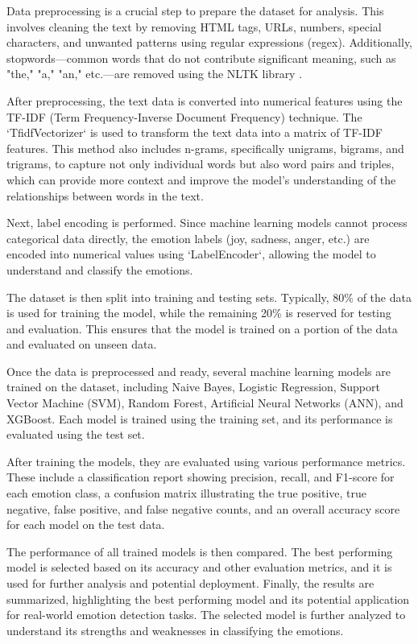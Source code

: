 Data preprocessing is a crucial step to prepare the dataset for analysis. This involves cleaning the text by removing HTML tags, URLs, numbers, special characters, and unwanted patterns using regular expressions (regex). Additionally, stopwords—common words that do not contribute significant meaning, such as "the," "a," "an," etc.—are removed using the NLTK library \cite{opinosis2024stopwords}.

After preprocessing, the text data is converted into numerical features using the TF-IDF (Term Frequency-Inverse Document Frequency) technique. The `TfidfVectorizer` is used to transform the text data into a matrix of TF-IDF features. This method also includes n-grams, specifically unigrams, bigrams, and trigrams, to capture not only individual words but also word pairs and triples, which can provide more context and improve the model's understanding of the relationships between words in the text.

Next, label encoding is performed. Since machine learning models cannot process categorical data directly, the emotion labels (joy, sadness, anger, etc.) are encoded into numerical values using `LabelEncoder`, allowing the model to understand and classify the emotions.

The dataset is then split into training and testing sets. Typically, 80\% of the data is used for training the model, while the remaining 20\% is reserved for testing and evaluation. This ensures that the model is trained on a portion of the data and evaluated on unseen data.

Once the data is preprocessed and ready, several machine learning models are trained on the dataset, including Naive Bayes, Logistic Regression, Support Vector Machine (SVM), Random Forest, Artificial Neural Networks (ANN), and XGBoost. Each model is trained using the training set, and its performance is evaluated using the test set.

After training the models, they are evaluated using various performance metrics. These include a classification report showing precision, recall, and F1-score for each emotion class, a confusion matrix illustrating the true positive, true negative, false positive, and false negative counts, and an overall accuracy score for each model on the test data.

The performance of all trained models is then compared. The best performing model is selected based on its accuracy and other evaluation metrics, and it is used for further analysis and potential deployment. Finally, the results are summarized, highlighting the best performing model and its potential application for real-world emotion detection tasks. The selected model is further analyzed to understand its strengths and weaknesses in classifying the emotions.
